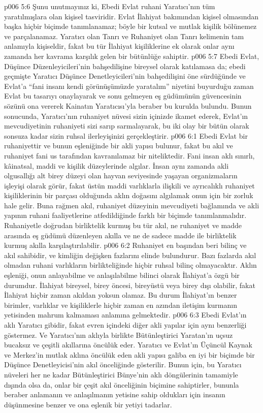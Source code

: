 \vs p006 5:6 Şunu unutmayınız ki, Ebedi Evlat ruhani Yaratıcı’nın tüm yaratılmışlara olan kişisel tasviridir. Evlat İlahiyat bakımından kişisel olmasından başka hiçbir biçimde tanımlanamaz; böyle bir kutsal ve mutlak kişilik bölünemez ve parçalanamaz. Yaratıcı olan Tanrı ve Ruhaniyet olan Tanrı kelimenin tam anlamıyla kişiseldir, fakat bu tür İlahiyat kişiliklerine ek olarak onlar aynı zamanda her kavrama karşılık gelen bir bütünlüğe sahiptir.
\vs p006 5:7 Ebedi Evlat, Düşünce Düzenleyicileri’nin bahşedilişine bireysel olarak katılamasa da; ebedi geçmişte Yaratıcı Düşünce Denetleyicileri’nin bahşedilişini öne sürdüğünde ve Evlat’a “fani insanı kendi görünüşümüzde yaratalım” niyetini buyurduğu zaman Evlat bu tasarıyı onaylayarak ve sonu gelmeyen eş güdümünün güvencesinin sözünü ona vererek Kainatın Yaratıcısı’yla beraber bu kurulda bulundu. Bunun sonucunda, Yaratıcı’nın ruhaniyet nüvesi sizin içinizde ikamet ederek, Evlat’ın mevcudiyetinin ruhaniyeti sizi sarıp sarmalayarak, bu iki olay bir bütün olarak sonsuza kadar sizin ruhsal ilerleyişinizi gerçekleştirir.
\vs p006 6:1 Ebedi Evlat bir ruhaniyettir ve bunun eşleniğinde bir akli yapısı bulunur, fakat bu akıl ve ruhaniyet fani us tarafından kavranılamaz bir niteliktedir. Fani insan aklı sınırlı, kâinatsal, maddi ve kişilik düzeylerinde algılar. İnsan aynı zamanda akli olgusallığı alt birey düzeyi olan hayvan seviyesinde yaşayan organizmaların işleyişi olarak görür, fakat üstün maddi varlıklarla ilişkili ve ayrıcalıklı ruhaniyet kişiliklerinin bir parçası olduğunda aklın doğasını algılamak onun için bir zorluk hale gelir. Buna rağmen akıl, ruhaniyet düzeyinin mevcudiyeti bağlamında ve akli yapının ruhani faaliyetlerine atfedildiğinde farklı bir biçimde tanımlanmalıdır. Ruhaniyetle doğrudan birliktelik kurmuş bu tür akıl, ne ruhaniyet ve madde arasında eş güdümü düzenleyen akılla ve ne de sadece madde ile birliktelik kurmuş akılla karşılaştırılabilir.
\vs p006 6:2 Ruhaniyet en başından beri bilinç ve akıl sahibidir, ve kimliğin değişken fazlarını elinde bulundurur. Bazı fazlarda akıl olmadan ruhani varlıkların birlikteliğinde hiçbir ruhsal bilinç olmayacaktır. Aklın eşleniği, onun anlayabilme ve anlaşılabilme bilinci olarak İlahiyat’a özgü bir durumdur. İlahiyat bireysel, birey öncesi, bireyüstü veya birey dışı olabilir, fakat İlahiyat hiçbir zaman akıldan yoksun olamaz. Bu durum İlahiyat’ın benzer birimler, varlıklar ve kişiliklerle hiçbir zaman en azından iletişim kurmanın yetisinden mahrum kalmaması anlamına gelmektedir.
\vs p006 6:3 Ebedi Evlat’ın aklı Yaratıcı gibidir, fakat evren içindeki diğer akli yapılar için aynı benzerliği göstermez. Ve Yaratıcı’nın aklıyla birlikte Bütünleştirici Yaratan’ın uçsuz bucaksız ve çeşitli akıllarına öncülük eder. Yaratıcı ve Evlat’ın Üçüncül Kaynak ve Merkez’in mutlak aklına öncülük eden akli yapısı galiba en iyi bir biçimde bir Düşünce Denetleyicisi’nin akıl önceliğinde gösterilir. Bunun için, bu Yaratıcı nüveleri her ne kadar Bütünleştirici Bünye’nin aklı döngülerinin tamamiyle dışında olsa da, onlar bir çeşit akıl önceliğinin biçimine sahiptirler, bununla beraber anlamanın ve anlaşılmanın yetisine sahip oldukları için insanın düşünmesine benzer ve ona eşlenik bir yetiyi tadarlar.
